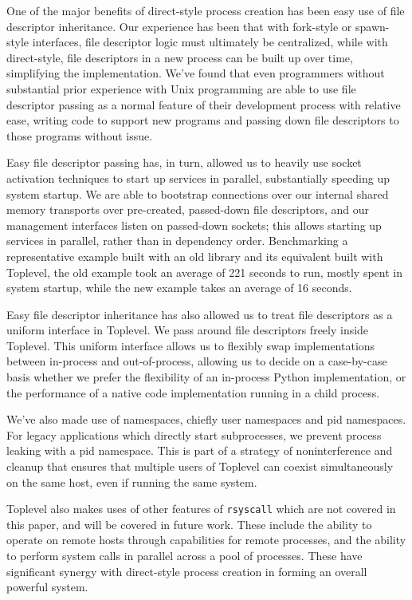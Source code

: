\documentclass[letterpaper,twocolumn,10pt]{article}
\begin{document}
One of the major benefits of direct-style process creation has been easy use of file descriptor inheritance.
Our experience has been that with fork-style or spawn-style interfaces,
file descriptor logic must ultimately be centralized,
while with direct-style,
file descriptors in a new process can be built up over time,
simplifying the implementation.
We've found that even programmers without substantial prior experience with Unix programming
are able to use file descriptor passing as a normal feature of their development process with relative ease,
writing code to support new programs and passing down file descriptors to those programs without issue.

Easy file descriptor passing has, in turn, allowed us to heavily use socket activation techniques
to start up services in parallel,
substantially speeding up system startup\cite{socketactivation}.
We are able to bootstrap connections over our internal shared memory transports
over pre-created, passed-down file descriptors,
and our management interfaces listen on passed-down sockets;
this allows starting up services in parallel, rather than in dependency order.
Benchmarking a representative example built with an old library
and its equivalent built with Toplevel,
the old example took an average of 221 seconds to run,
mostly spent in system startup,
while the new example takes an average of 16 seconds.

Easy file descriptor inheritance has also allowed us to treat file descriptors as a uniform interface in Toplevel.
We pass around file descriptors freely inside Toplevel.
This uniform interface allows us to flexibly swap implementations between in-process and out-of-process,
allowing us to decide on a case-by-case basis
whether we prefer the flexibility of an in-process Python implementation,
or the performance of a native code implementation running in a child process.

We've also made use of namespaces,
chiefly user namespaces and pid namespaces.
For legacy applications which directly start subprocesses,
we prevent process leaking with a pid namespace.
This is part of a strategy of noninterference and cleanup
that ensures that multiple users of Toplevel
can coexist simultaneously on the same host,
even if running the same system.

Toplevel also makes uses of other features of \texttt{rsyscall} which are not covered in this paper,
and will be covered in future work.
These include the ability to operate on remote hosts through capabilities for remote processes,
and the ability to perform system calls in parallel across a pool of processes.
These have significant synergy with direct-style process creation
in forming an overall powerful system.
\end{document}
